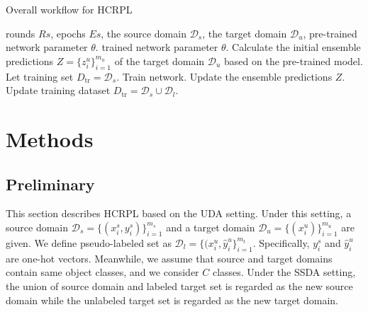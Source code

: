 \documentclass[a4paper,fleqn]{cas-dc}
\begin{document}
	\begin{algorithm}[htbp]
		\small
		\caption{Overall workflow for HCRPL}
		\label{algorithm1}
		\begin{algorithmic}[1]
			\Require rounds $Rs$, epochs $Es$, the source domain $\mathcal{D}_{s}$, the target domain $\mathcal{D}_{u}$, pre-trained network parameter $\theta$.
			\Ensure trained network parameter $\theta$. 
			\State Calculate the initial ensemble predictions $Z = \{z_i^u\}_{i=1}^{m_u}$ of the target domain $\mathcal{D}_{u}$ based on the pre-trained model.
			\State Let training set $D_{\text{tr}} = \mathcal{D}_{s}$.
			\State Train network. 
			\State Update the ensemble predictions $Z$. 
			\EndFor
			\State Update training dataset $D_{\text{tr}} = \mathcal{D}_{s} \cup \mathcal{D}_{l}$.
			\EndFor
		\end{algorithmic}
	\end{algorithm}
	
	\section{Methods}
	\subsection{Preliminary}
	This section describes HCRPL based on the UDA setting. Under this setting, a source domain $\mathcal{D}_{s} = \{(x_i^s, y_i^s)\}_{i=1}^{m_s}$ and a target domain $\mathcal{D}_{u} = \{(x_i^u)\}_{i=1}^{m_u}$ are given. We define pseudo-labeled set as $\mathcal{D}_{l} = \{(x_i^u, \hat{y}^u_i\}^{m_t}_{i=1}$. Specifically, $y_i^s$ and $\hat{y}^u_i$ are one-hot vectors. Meanwhile, we assume that source and target domains contain same object classes, and we consider $C$ classes. Under the SSDA setting, the union of source domain and labeled target set is regarded as the new source domain while the unlabeled target set is regarded as the new target domain.
	
\end{document}
